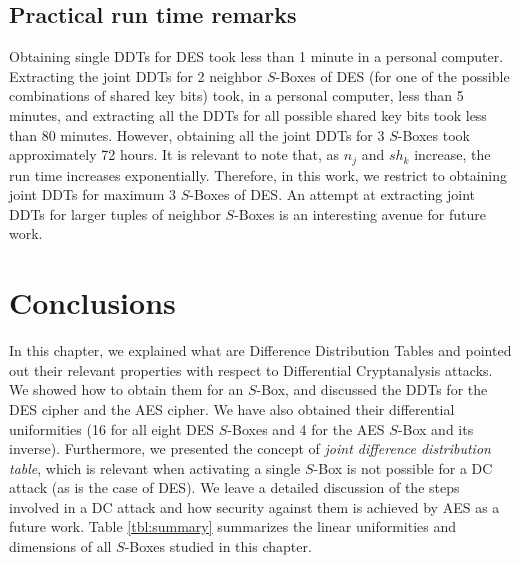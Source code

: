 \documentclass{report}
\begin{document}
\subsection{Practical run time remarks}
Obtaining single DDTs for DES took less than 1 minute in a personal computer. Extracting the joint DDTs for 2 neighbor $S$-Boxes of DES (for one of the possible combinations of shared key bits) took, in a personal computer, less than 5 minutes, and extracting all the DDTs for all possible shared key bits took less than 80 minutes. However, obtaining all the joint DDTs for 3 $S$-Boxes took approximately 72 hours. It is relevant to note that, as $n_j$ and $sh_k$ increase, the run time increases exponentially. Therefore, in this work, we restrict to obtaining joint DDTs for maximum 3 $S$-Boxes of DES. An attempt at extracting joint DDTs for larger tuples of neighbor $S$-Boxes is an interesting avenue for future work.

\section{Conclusions}
In this chapter, we explained what are Difference Distribution Tables and pointed out their relevant properties with respect to Differential Cryptanalysis attacks. We showed how to obtain them for an $S$-Box, and discussed the DDTs for the DES cipher and the AES cipher. We have also obtained their differential uniformities (16 for all eight DES $S$-Boxes and 4 for the AES $S$-Box and its inverse). Furthermore, we presented the concept of \emph{joint difference distribution table}, which is relevant when activating a single $S$-Box is not possible for a DC attack (as is the case of DES). We leave a detailed discussion of the steps involved in a DC attack and how security against them is achieved by AES as a future work. Table \ref{tbl:summary} summarizes the linear uniformities and dimensions of all $S$-Boxes studied in this chapter.
\end{document}
